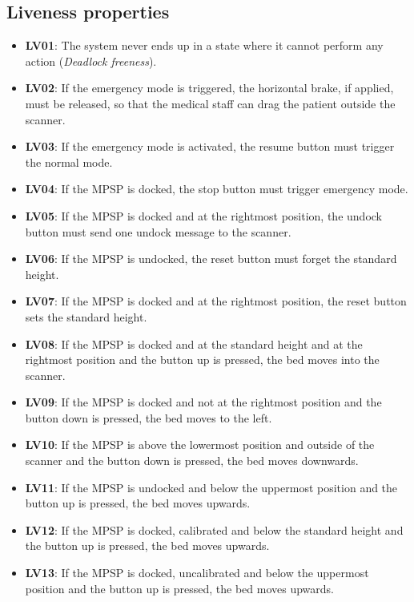 \subsection{Liveness properties}
\begin{itemize}
    \item \textbf{LV01}: The system never ends up in a state where it cannot perform any action (\emph{Deadlock freeness}).
    \item \textbf{LV02}: If the emergency mode is triggered, the horizontal brake, if applied, must be released, so that the medical staff can drag the patient outside the scanner.
    \item \textbf{LV03}: If the emergency mode is activated, the resume button must trigger the normal mode.
    \item \textbf{LV04}: If the MPSP is docked, the stop button must trigger emergency mode.
    \item \textbf{LV05}: If the MPSP is docked and at the rightmost position, the undock button must send one undock message to the scanner.
    \item \textbf{LV06}: If the MPSP is undocked, the reset button must forget the standard height.
    \item \textbf{LV07}: If the MPSP is docked and at the rightmost position, the reset button sets the standard height.
    \item \textbf{LV08}: If the MPSP is docked and at the standard height and at the rightmost position and the button up is pressed, the bed moves into the scanner.
    \item \textbf{LV09}: If the MPSP is docked and not at the rightmost position and the button down is pressed, the bed moves to the left.
    \item \textbf{LV10}: If the MPSP is above the lowermost position and outside of the scanner and the button down is pressed, the bed moves downwards.
    \item \textbf{LV11}: If the MPSP is undocked and below the uppermost position and the button up is pressed, the bed moves upwards.
    \item \textbf{LV12}: If the MPSP is docked, calibrated and below the standard height and the button up is pressed, the bed moves upwards.
    \item \textbf{LV13}: If the MPSP is docked, uncalibrated and below the uppermost position and the button up is pressed, the bed moves upwards.
\end{itemize}
